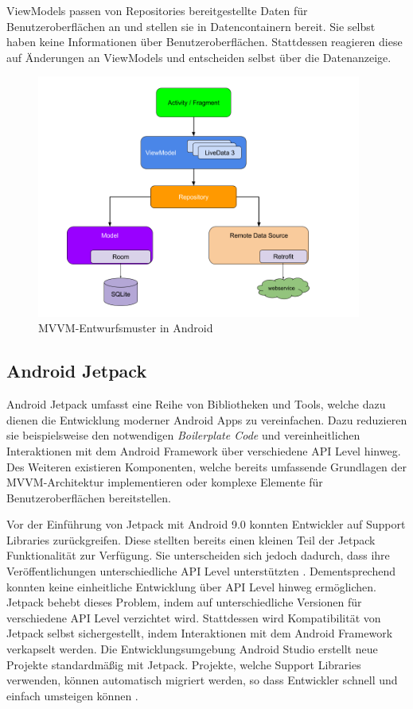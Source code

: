 ViewModels passen von Repositories bereitgestellte Daten für Benutzeroberflächen an und stellen sie in Datencontainern bereit.
Sie selbst haben keine Informationen über Benutzeroberflächen.
Stattdessen reagieren diese auf Änderungen an ViewModels und entscheiden selbst über die Datenanzeige.

\begin{figure}
	\centering
	\includegraphics[height=8cm,keepaspectratio]{./img/android-architecture.png}
	\caption{MVVM-Entwurfsmuster in Android \autocite{androidarchitecture}}
	\label{fig:app:architecture:mvvm}
\end{figure}

\subsection{Android Jetpack}
\label{subsec:app:jetpack}
Android Jetpack umfasst eine Reihe von Bibliotheken und Tools, welche dazu dienen die Entwicklung moderner Android Apps zu vereinfachen.
Dazu reduzieren sie beispielsweise den notwendigen \textit{Boilerplate Code} und vereinheitlichen Interaktionen mit dem Android Framework über verschiedene API Level hinweg.
Des Weiteren existieren Komponenten, welche bereits umfassende Grundlagen der MVVM-Architektur implementieren oder komplexe Elemente für Benutzeroberflächen bereitstellen.

Vor der Einführung von Jetpack mit Android 9.0 konnten Entwickler auf Support Libraries zurückgreifen.
Diese stellten bereits einen kleinen Teil der Jetpack Funktionalität zur Verfügung.
Sie unterscheiden sich jedoch dadurch, dass ihre Veröffentlichungen unterschiedliche API Level unterstützten \autocite{supportlibrariesversions}.
Dementsprechend konnten keine einheitliche Entwicklung über API Level hinweg ermöglichen.
Jetpack behebt dieses Problem, indem auf unterschiedliche Versionen für verschiedene API Level verzichtet wird.
Stattdessen wird Kompatibilität von Jetpack selbst sichergestellt, indem Interaktionen mit dem Android Framework verkapselt werden.
Die Entwicklungsumgebung Android Studio erstellt neue Projekte standardmäßig mit Jetpack.
Projekte, welche Support Libraries verwenden, können automatisch migriert werden, so dass Entwickler schnell und einfach umsteigen können \autocite{androidxmigration}.

